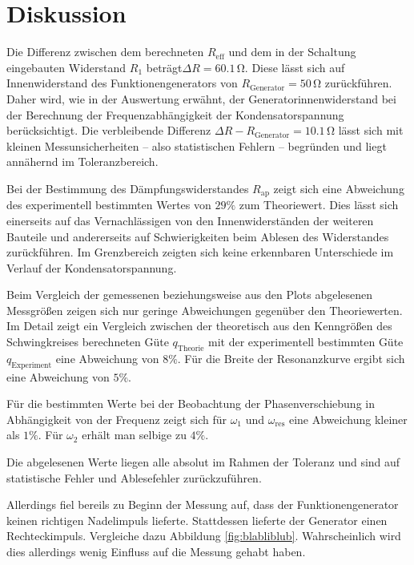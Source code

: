 \section{Diskussion}
\label{sec:Diskussion}
Die Differenz zwischen dem berechneten $R_\text{eff}$ und dem in der Schaltung eingebauten Widerstand $R_\text{1}$ beträgt$\Delta R=60.1 \,\si{\ohm}$.
Diese lässt sich auf Innenwiderstand des Funktionengenerators von $R_{\mathrm{Generator}}=50\,\si{\ohm}$ zurückführen.
Daher wird, wie in der Auswertung erwähnt, der Generatorinnenwiderstand bei der Berechnung der Frequenzabhängigkeit der Kondensatorspannung berücksichtigt.
Die verbleibende Differenz $\Delta R-R_{\mathrm{Generator}}=10.1 \,\si{\ohm}$ lässt sich mit kleinen Messunsicherheiten -- also statistischen Fehlern -- begründen und liegt annähernd im Toleranzbereich.

Bei der Bestimmung des Dämpfungswiderstandes $R_{\mathrm{ap}}$ zeigt sich eine Abweichung
des experimentell bestimmten Wertes von $29\%$ zum Theoriewert. Dies lässt sich einerseits
auf das Vernachlässigen von den Innenwiderständen der weiteren Bauteile und
andererseits auf Schwierigkeiten beim Ablesen des Widerstandes zurückführen. Im Grenzbereich zeigten
sich keine erkennbaren Unterschiede im Verlauf der Kondensatorspannung.

Beim Vergleich der gemessenen beziehungsweise aus den Plots abgelesenen Messgrößen zeigen sich nur geringe Abweichungen gegenüber den Theoriewerten.
Im Detail zeigt ein Vergleich zwischen der theoretisch aus den Kenngrößen des Schwingkreises berechneten Güte $q_\mathrm{Theorie}$ mit der experimentell bestimmten Güte $q_\mathrm{Experiment}$ eine Abweichung von $8\%$.
Für die Breite der Resonanzkurve ergibt sich eine Abweichung von $5\%$.

Für die bestimmten Werte bei der Beobachtung der Phasenverschiebung in Abhängigkeit von der
Frequenz zeigt sich für $\omega_1$ und $\omega_{\mathrm{res}}$ eine Abweichung kleiner als $1\%$. Für $\omega_2$ erhält man selbige zu $4\%$.

Die abgelesenen Werte liegen alle absolut im Rahmen der Toleranz und sind auf statistische Fehler
und Ablesefehler zurückzuführen.

Allerdings fiel bereils zu Beginn der Messung auf, dass der Funktionengenerator keinen richtigen Nadelimpuls lieferte. Stattdessen lieferte der Generator einen Rechteckimpuls. Vergleiche dazu Abbildung \ref{fig:blabliblub}.
Wahrscheinlich wird dies allerdings wenig Einfluss auf die Messung gehabt haben.

